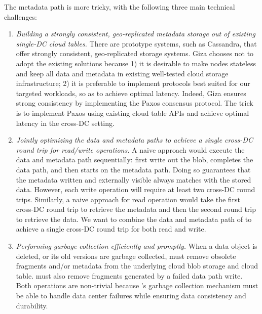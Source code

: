 The metadata path is more tricky, with the following three main technical challenges:
\begin{enumerate}

\item {\it Building a strongly consistent, geo-replicated metadata storage out of existing 
single-DC cloud tables.}
There are prototype systems, such as Cassandra,
that offer strongly consistent, geo-replicated storage systems.
Giza chooses not to adopt the existing solutions because
1) it is desirable to make \name nodes stateless and keep all data and metadata
in existing well-tested cloud storage infrastructure;
2) it is preferable to implement protocols best suited for our targeted workloads,
so as to achieve optimal latency.
Indeed, Giza ensures strong consistency by implementing the Paxos consensus protocol.
The trick is to implement Paxos using existing cloud table APIs and achieve 
optimal latency in the cross-DC setting.

\item {\it Jointly optimizing the data and metadata paths to achieve a single
cross-DC round trip for read/write operations.}
A naive approach would execute the data and metadata path sequentially:
first write out the blob, completes the data path, and then starts on the metadata path.
Doing so guarantees that the metadata written and externally visible always matches with the stored data. 
However, each write operation will require at least two cross-DC round trips.
Similarly, a naive approach for read operation would take the first cross-DC round trip to retrieve the metadata
and then the second round trip to retrieve the data.
We want to combine the data and metadata path of \name to achieve a single cross-DC round trip for both read and write.

\item {\it Performing garbage collection efficiently and promptly.} 
When a data object is deleted, or its old versions are garbage collected, 
\name must remove obsolete fragments and/or metadata from the underlying cloud blob storage and cloud table. 
\name must also remove fragments generated by a failed data path write.
Both operations are non-trivial because \name's garbage 
collection mechanism must be able to handle data center failures
while ensuring data consistency and durability.

\end{enumerate}

%


